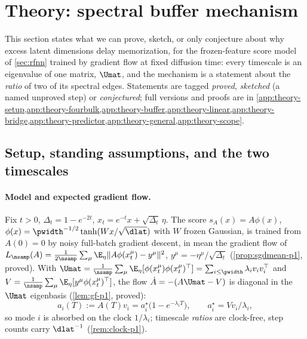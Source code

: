 \section{Theory: spectral buffer mechanism}
\label{sec:theory}

This section states what we can prove, sketch, or only conjecture about why excess latent dimensions delay memorization, for the frozen-feature score model of \cref{sec:rfnn} trained by gradient flow at fixed diffusion time: every timescale is an eigenvalue of one matrix, $\Umat$, and the mechanism is a statement about the \emph{ratio} of two of its spectral edges. Statements are tagged \emph{proved}, \emph{sketched} (a named unproved step) or \emph{conjectured}; full versions and proofs are in \cref{app:theory-setup,app:theory-fourbulk,app:theory-buffer,app:theory-linear,app:theory-bridge,app:theory-predictor,app:theory-general,app:theory-scope}.

\subsection{Setup, standing assumptions, and the two timescales}
\label{sec:theory-setup}

\paragraph{Model and expected gradient flow.}
Fix $t>0$, $\Delta_t=1-e^{-2t}$, $x_t=e^{-t}x+\sqrt{\Delta_t}\,\eta$. The score $s_A(x)=A\phi(x)$, $\phi(x)=\pwidth^{-1/2}\tanh(Wx/\sqrt{\dlat})$ with $W$ frozen Gaussian, is trained from $A(0)=0$ by noisy full-batch gradient descent, in mean the gradient flow of $L_{\nsamp}(A)=\tfrac1{2\nsamp}\sum_\mu\E_\eta\|A\phi(x_t^\mu)-y^\mu\|^2$, $y^\mu=-\eta^\mu/\sqrt{\Delta_t}$ (\cref{prop:sgdmean-p1}, proved). With $\Umat=\tfrac1{\nsamp}\sum_\mu\E_\eta[\phi(x^\mu_t)\phi(x^\mu_t)^{\top}]=\sum_{i\le\pwidth}\lambda_iv_iv_i^{\top}$ and $V=\tfrac1{\nsamp}\sum_\mu\E_\eta[y^\mu\phi(x^\mu_t)^{\top}]$, the flow $\dot A=-(A\Umat-V)$ is diagonal in the $\Umat$ eigenbasis (\cref{lem:gf-p1}, proved):
\begin{equation}\label{eq:mode-decay-main}
a_i(T):=A(T)v_i=a_i^\star\bigl(1-e^{-\lambda_iT}\bigr),\qquad a_i^\star=Vv_i/\lambda_i ,
\end{equation}
so mode $i$ is absorbed on the clock $1/\lambda_i$; timescale \emph{ratios} are clock-free, step counts carry $\dlat^{-1}$ (\cref{rem:clock-p1}).


